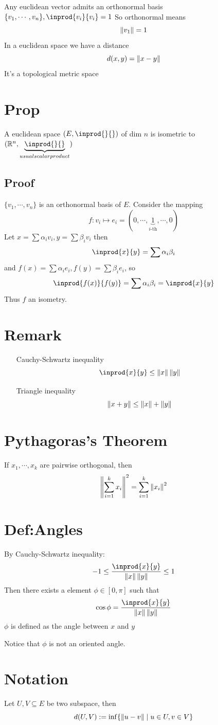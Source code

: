 \documentclass{book}
\begin{document}
Any euclidean vector admits an orthonormal basis $\{v_1,\cdots,v_n\},\inprod{v_i}{v_i}=1$ So orthonormal means $$\left\lVert v_1 \right\rVert=1$$
In a euclidean space we have a distance $$d(x,y)=\left\lVert x-y \right\rVert$$
It's a topological metric space
\section{Prop}
A euclidean space $(E,\inprod{}{})$ of dim $n$ is isometric to $(\mathbb{R}^n,\underbrace{\inprod{}{}}\limits_{usual scalar product})$
\subsection*{Proof}
$\{v_1,\cdots,v_n\}$ is an orthonormal basis of $E$. Consider the mapping$$f:v_i\mapsto e_i=(0,\cdots,\underbrace{1}\limits_{i\text{-th}},\cdots,0)$$
Let $x=\sum\alpha_iv_i, y=\sum\beta_iv_i$ then
$$\inprod{x}{y}=\sum\alpha_i\beta_i$$
and $f(x)=\sum\alpha_ie_i,f(y)=\sum\beta_ie_i$, so
$$\inprod{f(x)}{f(y)}=\sum\alpha_i\beta_i=\inprod{x}{y}$$
Thus $f$ an isometry.
\section{Remark}
\begin{itemize}
    \item [Cauchy-Schwartz inequality]$$\inprod{x}{y}\leq\norm{x}\norm{y}$$
    \item [Triangle inequality]$$\left\lVert x+y \right\rVert\leq\left\lVert x \right\rVert+\left\lVert y \right\rVert$$
\end{itemize}
\section{Pythagoras's Theorem}
\label{Pythagoras}
If $x_1,\cdots,x_k$ are pairwise orthogonal, then
$$\left\lVert \sum\limits_{i=1}^kx_i \right\rVert^2=\sum\limits_{i=1}^k\left\lVert x_i \right\rVert^2$$
\section{Def:Angles}
By Cauchy-Schwartz inequality:
$$-1\leq\frac{\inprod{x}{y}}{\norm{x}\norm{y}}\leq1$$
Then there exists a element $\phi\in [0,\pi]$ such that
$$\cos\phi=\frac{\inprod{x}{y}}{\norm{x}\norm{y}}$$
$\phi$ is defined as the angle between $x$ and $y$

Notice that $\phi$ is not an oriented angle.
\section{Notation}
Let $U,V\subseteq E$ be two subspace, then $$d(U,V):=\inf\{\left\lVert u-v \right\rVert\mid u\in U,v\in V\}$$
\end{document}
